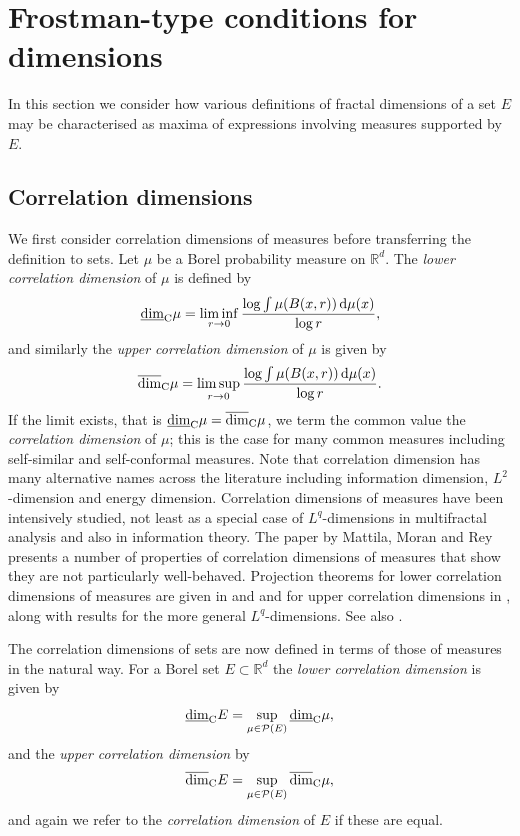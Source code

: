 \documentclass[12pt]{article}
\newcommand{\1}{{\bf 1}}
\newcommand\ucod{\overline{\mbox{\rm dim}}_{\rm C}} %
\newcommand\lcod{\underline{\mbox{\rm dim}}_{\rm C}} %
\newcommand{\R}{\mathbb{R}}
\begin{document}
	

\section{Frostman-type conditions for dimensions}\label{sec2}
\setcounter{equation}{0}
\setcounter{theo}{0}
In this section we consider how various definitions of fractal dimensions of a set $E$ may be characterised as maxima of expressions involving  measures supported by $E$.


\subsection{Correlation dimensions}

	We  first consider correlation dimensions of measures before transferring the definition to sets. 
	Let $\mu$ be a Borel probability  measure on $\R^d$.
	The {\it lower correlation dimension}  of $\mu$ is defined by 
	\begin{equation}\label{lcdm}
		\lcod \mu=\liminf_{r\rightarrow0}\dfrac{\log\int\mu(B(x,r))\,\mathrm{d} \mu(x)}{\log r}, 
	\end{equation}
and similarly the  {\it upper correlation dimension}  of $\mu$ is given by 
	\begin{equation}\label{ucdm}
		\ucod \mu=\limsup_{r\rightarrow0}\dfrac{\log\int\mu(B(x,r))\,\mathrm{d} \mu(x)}{\log r}. 
	\end{equation}	
If the limit exists, that is $\lcod \mu=\ucod \mu$, we term the common value the {\it correlation dimension} of $\mu$; this is the case for many common measures including self-similar and self-conformal measures. Note that correlation dimension has many alternative names across the literature including information dimension, $L^2$-dimension and energy dimension.
Correlation dimensions of measures have been intensively studied, not least as a special case of $L^q$-dimensions in multifractal analysis and also in information theory. The paper by Mattila, Moran and Rey \cite{MM} presents a number of properties of correlation dimensions of measures that show they are not particularly well-behaved. Projection theorems for  lower correlation dimensions of measures are  given in \cite{FO} and \cite{HK} and for upper correlation dimensions   in \cite{FO}, along with results for the more general $L^q$-dimensions. See also \cite{Cu, FFK}.
	
The correlation dimensions of sets are now defined in terms of those of measures in the natural way.
For a Borel set $E \subset \R^d$ the {\it lower correlation dimension} is given by
\begin{equation}\label{lcds}
	\lcod E=\sup_{\mu\in\mathcal{P}(E)}\lcod \mu,
\end{equation}
and the {\it upper correlation dimension} by
\begin{equation}\label{ucds}
	\ucod E=\sup_{\mu\in\mathcal{P}(E)}\ucod \mu,
\end{equation}
and again we refer to the {\it correlation dimension} of $E$ if these are equal.
\end{document}
